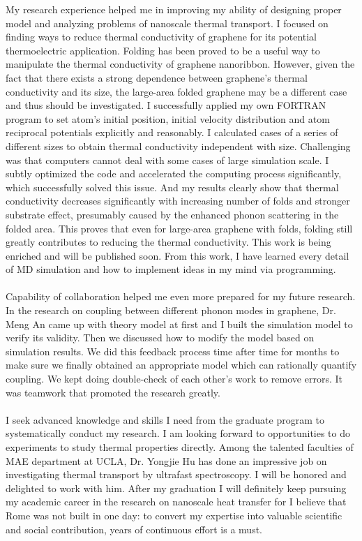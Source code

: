 \documentclass[a4paper,10pt]{article}
\begin{document}
\begin{spacing}{1.5}
My research experience helped me in improving my ability of designing proper model and analyzing problems of nanoscale thermal transport. I focused on finding ways to reduce thermal conductivity of graphene for its potential thermoelectric application. Folding has been proved to be a useful way to manipulate the thermal conductivity of graphene nanoribbon. However, given the fact that there exists a strong dependence between graphene’s thermal conductivity and its size, the large-area folded graphene may be a different case and thus should be investigated. I successfully applied my own FORTRAN program to set atom’s initial position, initial velocity distribution and atom reciprocal potentials explicitly and reasonably. I calculated cases of a series of different sizes to obtain thermal conductivity independent with size. Challenging was that computers cannot deal with some cases of large simulation scale. I subtly optimized the code and accelerated the computing process significantly, which successfully solved this issue. And my results clearly show that thermal conductivity decreases significantly with increasing number of folds and stronger substrate effect, presumably caused by the enhanced phonon scattering in the folded area. This proves that even for large-area graphene with folds, folding still greatly contributes to reducing the thermal conductivity. This work is being enriched and will be published soon. From this work, I have learned every detail of MD simulation and how to implement ideas in my mind via programming.\\
\\
Capability of collaboration helped me even more prepared for my future research. In the research on coupling between different phonon modes in graphene, Dr. Meng An came up with theory model at first and I built the simulation model to verify its validity. Then we discussed how to modify the model based on simulation results. We did this feedback process time after time for months to make sure we finally obtained an appropriate model which can rationally quantify coupling. We kept doing double-check of each other’s work to remove errors. It was teamwork that promoted the research greatly.\\
\\
I seek advanced knowledge and skills I need from the graduate program to systematically conduct my research. I am looking forward to opportunities to do experiments to study thermal properties directly. Among the talented faculties of MAE department at UCLA, Dr. Yongjie Hu has done an impressive job on investigating thermal transport by ultrafast spectroscopy. I will be honored and delighted to work with him. After my graduation I will definitely keep pursuing my academic career in the research on nanoscale heat transfer for I believe that Rome was not built in one day: to convert my expertise into valuable scientific and social contribution, years of continuous effort is a must.\\

\end{spacing}
\end{document}
